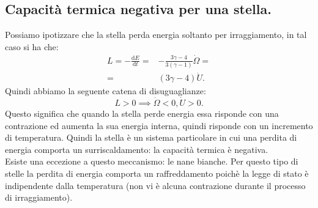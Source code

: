 \subsection{Capacità termica negativa per una stella.}
\label{subsec:Capacità termica negativa per una stella.}
Possiamo ipotizzare che la stella perda energia soltanto per irraggiamento, in tal caso si ha che:
\[\begin{aligned}
	L = -\frac{\mbox{d} E}{\mbox{d} t} 
	=& 
	-\frac{3\gamma -4}{3\left( \gamma-1 \right) }\dot{\Omega}=\\
	=&
	\left( 3\gamma -4 \right) \dot{U}
.\end{aligned}\]
Quindi abbiamo la seguente catena di disuguaglianze:
\[
	L>0 \implies \dot{\Omega }<0, \dot{U} >0
.\] 
Questo significa che quando la stella perde energia essa risponde con una contrazione ed aumenta la sua energia interna, quindi risponde con un incremento di temperatura. Quindi la stella è un sistema particolare in cui una perdita di energia comporta un surriscaldamento: la capacità termica è negativa.\\
Esiste una eccezione a questo meccanismo: le nane bianche. Per questo tipo di stelle la perdita di energia comporta un raffreddamento poichè la legge di stato è indipendente dalla temperatura (non vi è alcuna contrazione durante il processo di irraggiamento).
